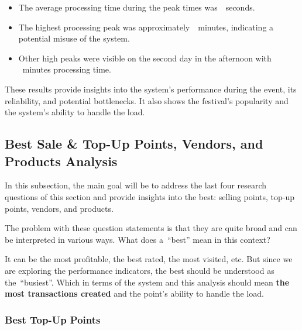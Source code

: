 \begin{keytakeaways}
	\begin{itemize}
		\item The average processing time during the peak times was~~seconds.
		\item The highest processing peak was approximately~~minutes, indicating a potential misuse of the system.
		\item Other high peaks were visible on the second day in the afternoon with ~ ~minutes processing time.
	\end{itemize}
\end{keytakeaways}

These results provide insights into the system's performance during the event, its reliability, and potential bottlenecks.
It also shows the festival's popularity and the system's ability to handle the load.


\subsection{Best Sale \& Top-Up Points, Vendors, and Products Analysis}
\label{subsec:analysis-performance-indicators-best}
In this subsection, the main goal will be to address the last four research questions of this section and provide insights into the best: selling points, top-up points, vendors, and products.

The problem with these question statements is that they are quite broad and can be interpreted in various ways.
What does a~\enquote{best} mean in this context?

It can be the most profitable, the best rated, the most visited, etc.
But since we are exploring the performance indicators, the best should be understood as the~\enquote{busiest}.
Which in terms of the system and this analysis should mean \textbf{the most transactions created} and the point's ability to handle the load.


\subsubsection{Best Top-Up Points}
\label{subsubsec:analysis-best-top-up-points}


